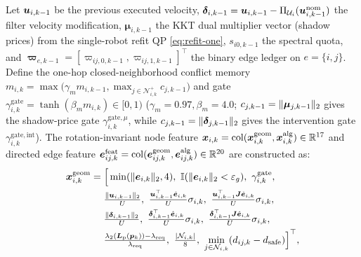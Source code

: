Let $\boldsymbol{u}_{i,k-1}$ be the previous executed velocity, $\boldsymbol\delta_{i,k-1}=\boldsymbol{u}_{i,k-1}-\Pi_{\mathcal U_i}(\boldsymbol{u}_{i,k-1}^{\mathrm{nom}})$ the filter velocity modification, $\boldsymbol\mu_{i,k-1}$ the KKT dual multiplier vector (shadow prices) from the single-robot refit QP \eqref{eq:refit-one}, $s_{i0,k-1}$ the spectral quota, and $\boldsymbol\varpi_{e,k-1}=[\varpi_{ij,0,k-1},\varpi_{ij,1,k-1}]^{\top}$ the binary edge ledger on $e=\{i,j\}$. Define the one-hop closed-neighborhood conflict memory $m_{i,k}=\max\bigl(\gamma_m m_{i,k-1},\max_{j\in\mathcal N_{i,k}^+}c_{j,k-1}\bigr)$ and gate $\gamma_{i,k}^{\mathrm{gate}}=\tanh(\beta_m m_{i,k})\in[0,1)$ ($\gamma_m=0.97,\beta_m=4.0$; $c_{j,k-1}=\lVert\boldsymbol\mu_{j,k-1}\rVert_2$ gives the shadow-price gate $\gamma_{i,k}^{\mathrm{gate},\mu}$, while $c_{j,k-1}=\lVert\boldsymbol\delta_{j,k-1}\rVert_2$ gives the intervention gate $\gamma_{i,k}^{\mathrm{gate,int}}$). The rotation-invariant node feature $\boldsymbol x_{i,k}=\operatorname{col}(\boldsymbol x_{i,k}^{\mathrm{geom}},\boldsymbol x_{i,k}^{\mathrm{alg}})\in\mathbb R^{17}$ and directed edge feature $\boldsymbol e_{ij,k}^{\mathrm{feat}}=\operatorname{col}(\boldsymbol e_{ij,k}^{\mathrm{geom}},\boldsymbol e_{ij,k}^{\mathrm{alg}})\in\mathbb R^{20}$ are constructed as:
\begin{equation}
\begin{split}
 \boldsymbol x_{i,k}^{\mathrm{geom}}&=\Big[\min(\norm{\be_{i,k}}_2,4),\ \mathbb I(\norm{\be_{i,k}}_2<\varepsilon_g),\ \gamma_{i,k}^{\mathrm{gate}},\\
 &\quad\ \tfrac{\norm{\bu_{i,k-1}}_2}{U},\ \tfrac{\bu_{i,k-1}^{\top}\hat{\be}_{i,k}}{U}\sigma_{i,k},\ \tfrac{\bu_{i,k-1}^{\top}\bJ\hat{\be}_{i,k}}{U}\sigma_{i,k},\\
 &\quad\ \tfrac{\norm{\boldsymbol\delta_{i,k-1}}_2}{U},\ \tfrac{\boldsymbol\delta_{i,k-1}^{\top}\hat{\be}_{i,k}}{U}\sigma_{i,k},\ \tfrac{\boldsymbol\delta_{i,k-1}^{\top}\bJ\hat{\be}_{i,k}}{U}\sigma_{i,k},\\
 &\quad\ \tfrac{\lambda_2(\bL(\bp_k))-\lr}{\lr},\ \tfrac{|\mathcal N_{i,k}|}{8},\ \min_{j\in\mathcal N_{i,k}}(d_{ij,k}-\ds)\Big]^{\top},
\end{split}\label{eq:node-geom}
\end{equation}
